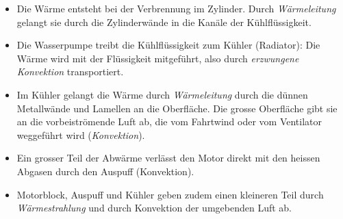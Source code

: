 \begin{itemize}
\item Die Wärme entsteht bei der Verbrennung im Zylinder. Durch \emph{Wärmeleitung} gelangt sie durch die Zylinderwände in die Kanäle der Kühlflüssigkeit.
\item Die Wasserpumpe treibt die Kühlflüssigkeit zum Kühler (Radiator): Die Wärme wird mit der Flüssigkeit mitgeführt, also durch \emph{erzwungene Konvektion} transportiert.
\item Im Kühler gelangt die Wärme durch \emph{Wärmeleitung} durch die dünnen Metallwände und Lamellen an die Oberfläche. Die grosse Oberfläche gibt sie an die vorbeiströmende Luft ab, die vom Fahrtwind oder vom Ventilator weggeführt wird (\emph{Konvektion}).
\item Ein grosser Teil der Abwärme verlässt den Motor direkt mit den heissen Abgasen durch den Auspuff (Konvektion).
\item Motorblock, Auspuff und Kühler geben zudem einen kleineren Teil durch \emph{Wärmestrahlung} und durch Konvektion der umgebenden Luft ab.
\end{itemize}
